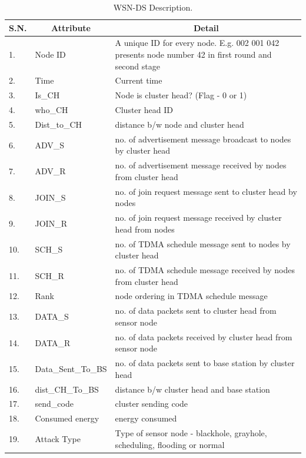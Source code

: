 \begin{longtable}[c]{|p{0.5in}|p{1.5in}|p{3.5in}|}
\caption{WSN-DS Description.}
\label{tab:WSNDS}\\
\hline
\multicolumn{1}{|c|}{\textbf{S.N.}} & \multicolumn{1}{c|}{\textbf{Attribute}} & \multicolumn{1}{c|}{\textbf{Detail}} \\ \hline
\endfirsthead
%
\endhead
%
1. & Node ID & A unique ID for every node. E.g. 002 001 042 presents node number 42 in first round and second stage \\ \hline
2. & Time & Current time \\ \hline
3. & Is\_CH & Node is cluster head? (Flag - 0 or 1) \\ \hline
4. & who\_CH & Cluster head ID \\ \hline
5. & Dist\_to\_CH & distance b/w node and cluster head \\ \hline
6. & ADV\_S & no. of advertisement message broadcast to nodes by cluster head \\ \hline
7. & ADV\_R & no. of advertisement message received by nodes from cluster head \\ \hline
8. & JOIN\_S & no. of join request message sent to cluster head by nodes \\ \hline
9. & JOIN\_R & no. of join request message received by cluster head from nodes \\ \hline
10. & SCH\_S & no. of TDMA schedule message sent to nodes by cluster head \\ \hline
11. & SCH\_R & no. of TDMA schedule message received by nodes from cluster head \\ \hline
12. & Rank & node ordering in TDMA schedule message \\ \hline
13. & DATA\_S & no. of data packets sent to cluster head from sensor node \\ \hline
14. & DATA\_R & no. of data packets received by cluster head from sensor node \\ \hline
15. & Data\_Sent\_To\_BS & no. of data packets sent to base station by cluster head \\ \hline
16. & dist\_CH\_To\_BS & distance b/w cluster head and base station \\ \hline
17. & send\_code & cluster sending code \\ \hline
18. & Consumed energy & energy consumed \\ \hline
19. & Attack Type & Type of sensor node - blackhole, grayhole, scheduling, flooding or normal \\ \hline
\end{longtable}



